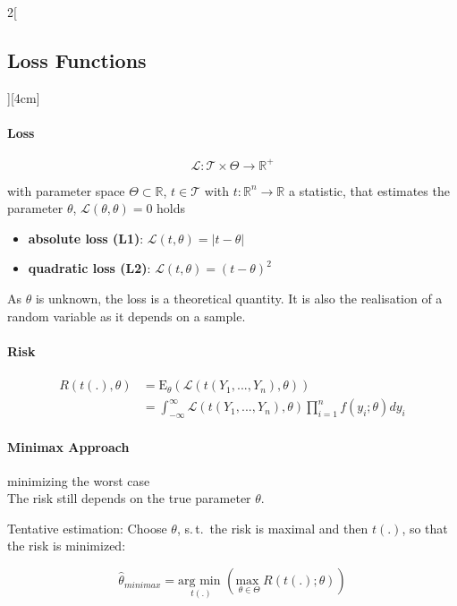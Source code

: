 \documentclass[8pt]{extarticle}
\begin{document}
\begin{multicols}{2}[\subsection{Loss Functions}][4cm]

\paragraph{Loss}

$$\mathcal{L}: \mathcal{T} \times \Theta \rightarrow \mathbb{R}^+$$

\noindent with parameter space $\Theta \subset \mathbb{R}$, $t\in \mathcal{T}$ with $t:\mathbb{R}^n \rightarrow \mathbb{R}$ a statistic, that estimates the parameter $\theta$,
 $\mathcal{L}(\theta, \theta) = 0$ holds

\begin{itemize}
\item \textbf{absolute loss (L1)}: $\mathcal{L}(t, \theta) = \left|t-\theta \right|$
\item \textbf{quadratic loss (L2)}: $\mathcal{L}(t, \theta) = (t-\theta)^2$
\end{itemize}

\noindent As $\theta$ is unknown, the loss is a theoretical quantity. It is also the realisation of a random variable as it depends on a sample.

\paragraph{Risk}

\begin{align*}
R(t(.), \theta) &= \mathrm{E}_\theta \left(\mathcal{L}(t(Y_1,...,Y_n),\theta)\right) \\
&= \int_{-\infty}^\infty \mathcal{L}(t(Y_1,...,Y_n),\theta) \prod_{i=1}^n f(y_i;\theta)dy_i
\end{align*}

\paragraph{Minimax Approach} minimizing the worst case \\
\noindent The risk still depends on the true parameter $\theta$.

\noindent Tentative estimation: Choose $\theta$, s.\,t.\ the risk is maximal and then $t(.)$, so that the risk is minimized:

$$\hat{\theta}_{minimax} = \underset{t(.)}{\text{arg min }} \left(\underset{\theta \in \Theta}{\text{max }} R(t(.);\theta)\right)$$



\end{multicols}
\end{document}
